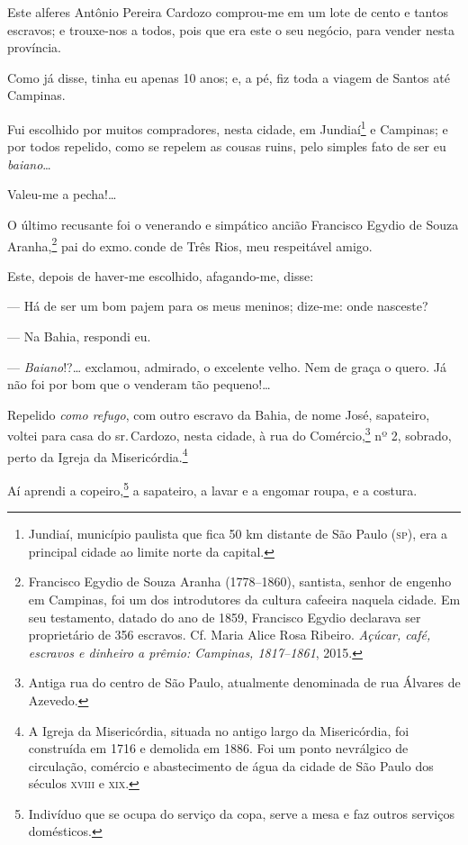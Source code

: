 Este alferes Antônio Pereira Cardozo comprou-me em um lote de cento e
tantos escravos; e trouxe-nos a todos, pois que era este o seu negócio,
para vender nesta província.

Como já disse, tinha eu apenas 10 anos; e, a pé, fiz toda a viagem de
Santos até Campinas.

Fui escolhido por muitos compradores, nesta cidade, em Jundiaí\footnote{
  Jundiaí, município paulista que fica 50 km distante de São Paulo (\textsc{sp}),
  era a principal cidade ao limite norte da capital.} e Campinas; e por
todos repelido, como se repelem as cousas ruins, pelo simples fato de
ser eu \emph{baiano}\ldots{}

Valeu-me a pecha!\ldots{}

O último recusante foi o venerando e simpático ancião Francisco Egydio
de Souza Aranha,\footnote{Francisco Egydio de Souza Aranha (1778--1860), \label{egydio}
  santista, senhor de engenho em Campinas, foi um dos introdutores
  da cultura cafeeira naquela cidade. Em seu testamento, datado do ano
  de 1859, Francisco Egydio declarava ser proprietário de 356 escravos.
  Cf. Maria Alice Rosa Ribeiro. \emph{Açúcar, café, escravos e dinheiro
  a prêmio: Campinas, 1817--1861}, 2015.} pai do exmo.\,conde de Três Rios, meu
respeitável amigo.

Este, depois de haver-me escolhido, afagando-me, disse:

--- Há de ser um bom pajem para os meus meninos; dize-me: onde
nasceste?

--- Na Bahia, respondi eu.

--- \emph{Baiano}!?\ldots{} exclamou, admirado, o excelente velho. Nem de
graça o quero. Já não foi por bom que o venderam tão pequeno!\ldots{}

Repelido \emph{como refugo}, com outro escravo da Bahia, de nome José,
sapateiro, voltei para casa do sr.\,Cardozo, nesta cidade, à rua do
Comércio,\footnote{Antiga rua do centro de São Paulo, atualmente
  denominada de rua Álvares de Azevedo.} nº 2, sobrado, perto da Igreja
da Misericórdia.\footnote{A Igreja da Misericórdia, situada no antigo
  largo da Misericórdia, foi construída em 1716 e demolida em 1886. Foi
  um ponto nevrálgico de circulação, comércio e abastecimento de água da
  cidade de São Paulo dos séculos \textsc{xviii} e \textsc{xix}.}

Aí aprendi a copeiro,\footnote{Indivíduo que se ocupa do serviço da
  copa, serve a mesa e faz outros serviços domésticos.} a sapateiro, a
lavar e a engomar roupa, e a costura.

